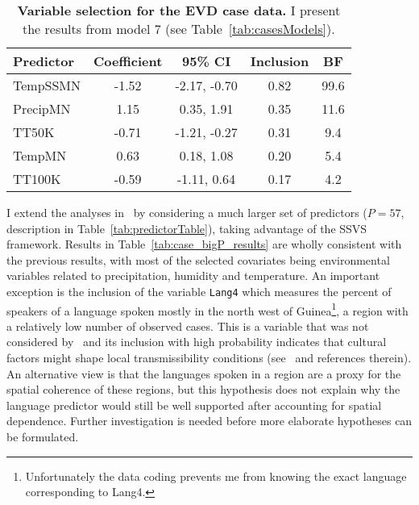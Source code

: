 \begin{minipage}{\textwidth}    
\setcounter{mpfootnote}{\value{footnote}}
\renewcommand{\thempfootnote}{\arabic{mpfootnote}}
\fontsize{9}{11}\selectfont
{}
\begin{longtable}{lcccc}
\caption[Variable selection for the EVD case data.]{\textbf{Variable selection for the EVD case data.}
I present the results from model 7 (see Table~\ref{tab:casesModels}).
}
\label{tab:case_glm_results}\\
\toprule
Predictor\footnotemark[1] & Coefficient\footnotemark[2] & 95\% CI\footnotemark[3] & Inclusion\footnotemark[4] & BF\footnotemark[5] \\
\toprule
TempSSMN & -1.52 & -2.17, -0.70 & 0.82 & 99.6 \\
\hline
PrecipMN & 1.15 & 0.35, 1.91 & 0.35 & 11.6 \\
\hline
TT50K &  -0.71 & -1.21, -0.27 & 0.31 & 9.4 \\
\hline
TempMN &  0.63 & 0.18, 1.08 & 0.20 & 5.4 \\
\hline
TT100K & -0.59 & -1.11, 0.64 & 0.17 & 4.2\\
\bottomrule
\end{longtable}
\setcounter{footnote}{\value{mpfootnote}}
\end{minipage}

I extend the analyses in~\cite{Dudas2017} by considering a much larger set of predictors ($P = 57$, description in Table~\ref{tab:predictorTable}), taking advantage of the SSVS framework.
Results in Table~\ref{tab:case_bigP_results} are wholly consistent with the previous results, with most of the selected covariates being environmental variables related to precipitation, humidity and temperature.
An important exception is the inclusion of the variable \verb|Lang4| which measures the percent of speakers of a language spoken mostly in the north west of Guinea\footnote{Unfortunately the data coding prevents me from knowing the exact language corresponding to  Lang4.}, a region with a relatively low number of observed cases.
This is a variable that was not considered by~\cite{Dudas2017} and its inclusion with high probability indicates that cultural factors might shape local transmissibility conditions (see~\cite{Alexander2015} and references therein).
An alternative view is that the languages spoken in a region are a proxy for the spatial coherence of these regions, but this hypothesis does not explain why the language predictor would still be well supported after accounting for spatial dependence.
Further investigation is needed before more elaborate hypotheses can be formulated.

